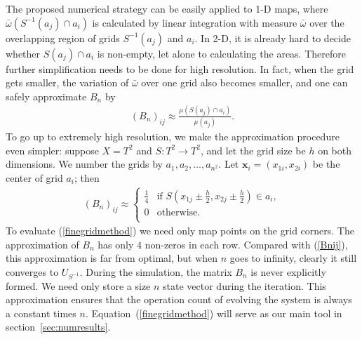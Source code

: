 

The proposed numerical strategy can be easily applied to 1-D maps, where $\bar{\omega}(S^{-1}(a_j)\cap a_i)$ is calculated by linear integration with measure $\bar{\omega}$ over the overlapping region of grids $S^{-1}(a_j)$ and $a_i$. In 2-D, it is already hard to decide whether $S(a_j)\cap a_i$ is non-empty, let alone to calculating the areas. Therefore further simplification needs to be done for high resolution. In fact, when the grid gets smaller, the variation of $\bar{\omega}$ over one grid also becomes smaller, and one can safely approximate $B_n$ by
 \begin{eqnarray}
    \label{Anijapprox}
    (B_n)_{ij} \approx  \frac{{\mu}(S(a_j)\cap a_i)}{\mu(a_j)}.
   \end{eqnarray}
To go up to extremely high resolution, we make the approximation
procedure even simpler: suppose $X = T^2$ and $S: T^2 \rightarrow
T^2$, and let the grid size be $h$ on both dimensions. We number the grids
by $a_1,a_2,\ldots, a_{n^2}$. Let $\mathbf{x}_i =(x_{1i},x_{2i})$ be the
center of grid $a_i$; then
 \begin{eqnarray}
 \label{finegridmethod}
 (B_n)_{ij} \approx \begin{cases}
   \frac{1}{4} &\mbox{if } S(x_{1j}\pm \frac{h}{2},x_{2j}\pm \frac{h}{2}) \in a_i, \\
   0           &\mbox{otherwise}. \\
 \end{cases}
 \end{eqnarray}
To evaluate (\ref{finegridmethod}) we need only map points on the grid corners. The approximation of $B_n$ has only $4$ non-zeros in each row. Compared with (\ref{Bnij}), this approximation is far from optimal, but when $n$ goes to infinity, clearly it still converges to $U_{S^{-1}}$. During the simulation, the matrix $B_n$ is never explicitly
formed. We need only store a size $n$ state vector during the iteration. This approximation ensures that the operation count of evolving the system is always a constant times $n$. Equation~(\ref{finegridmethod}) will serve as our main tool in section~\ref{sec:numresults}. 

